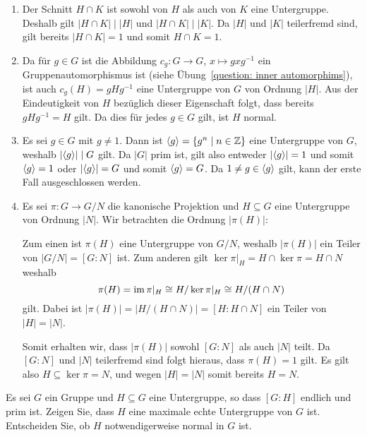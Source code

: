 \begin{solution}
  \begin{enumerate}
    \item
      Der Schnitt $H \cap K$ ist sowohl von $H$ als auch von $K$ eine Untergruppe.
      Deshalb gilt $|H \cap K| \mid |H|$ und $|H \cap K| \mid |K|$.
      Da $|H|$ und $|K|$ teilerfremd sind, gilt bereits $|H \cap K| = 1$ und somit $H \cap K = 1$.
      
    \item
      Da für $g \in G$ ist die Abbildung $c_g \colon G \to G$, $x \mapsto gxg^{-1}$ ein Gruppenautomorphismus ist (siehe Übung~\ref{question: inner automorphims}), ist auch $c_g(H) = gHg^{-1}$ eine Untergruppe von $G$ von Ordnung $|H|$.
      Aus der Eindeutigkeit von $H$ bezüglich dieser Eigenschaft folgt, dass bereits $g H g^{-1} = H$ gilt.
      Da dies für jedes $g \in G$ gilt, ist $H$ normal.
    
    \item
      Es sei $g \in G$ mit $g \neq 1$.
      Dann ist $\langle g\rangle = \{g^n \mid n \in \mathbb{Z}\}$ eine Untergruppe von $G$, weshalb $|{\langle g\rangle}| \mid G$ gilt.
      Da $|G|$ prim ist, gilt also entweder $|{\langle g\rangle}| = 1$ und somit $\langle g\rangle = 1$ oder $|{\langle g\rangle}| = G$ und somit $\langle g\rangle = G$.
      Da $1 \neq g \in \langle g\rangle$ gilt, kann der erste Fall ausgeschlossen werden.
    
    \item
      Es sei $\pi \colon G \to G/N$ die kanonische Projektion und $H \subseteq G$ eine Untergruppe von Ordnung $|N|$.
      Wir betrachten die Ordnung $|\pi(H)|$:
      
      Zum einen ist $\pi(H)$ eine Untergruppe von $G/N$, weshalb $|\pi(H)|$ ein Teiler von $|G/N| = [G : N]$ ist.
      Zum anderen gilt $\ker \pi|_H = H \cap \ker \pi = H \cap N$ weshalb
      \[
        \pi(H) = \operatorname{im} \pi|_H \cong H / \ker \pi|_H \cong H / (H \cap N)
      \]
      gilt.
      Dabei ist $|\pi(H)| = |H/(H \cap N)| = [H : H \cap N]$ ein Teiler von $|H| = |N|$.
      
      Somit erhalten wir, dass $|\pi(H)|$ sowohl $[G : N]$ als auch $|N|$ teilt.
      Da $[G : N]$ und $|N|$ teilerfremd sind folgt hieraus, dass $\pi(H) = 1$ gilt.
      Es gilt also $H \subseteq \ker \pi = N$, und wegen $|H| = |N|$ somit bereits $H = N$.
  \end{enumerate}
\end{solution}


\begin{question}[subtitle = Ein Kriterium für maximale Untergruppen]
  Es sei $G$ ein Gruppe und $H \subseteq G$ eine Untergruppe, so dass $[G : H]$ endlich und prim ist.
  Zeigen Sie, dass $H$ eine maximale echte Untergruppe von $G$ ist. Entscheiden Sie, ob $H$ notwendigerweise normal in $G$ ist.
\end{question}


